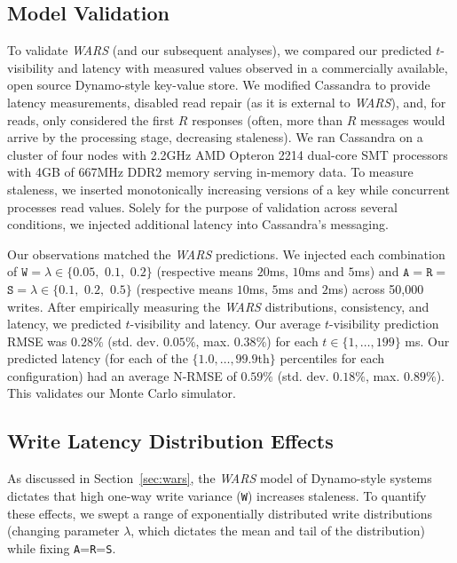 \documentclass{vldb}
\newcommand{\subsectionskip}{-0em}
\begin{document}
\vspace{\subsectionskip}\subsection{Model Validation}

To validate \textit{WARS} (and our subsequent analyses), we compared
our predicted $t$-visibility and latency with measured values observed
in a commercially available, open source Dynamo-style key-value store.
We modified Cassandra to provide latency measurements, disabled read
repair (as it is external to \textit{WARS}), and, for reads, only
considered the first $R$ responses (often, more than $R$ messages
would arrive by the processing stage, decreasing staleness).  We ran
Cassandra on a cluster of four nodes with 2.2GHz AMD Opteron 2214
dual-core SMT processors with 4GB of 667MHz DDR2 memory serving
in-memory data.  To measure staleness, we inserted monotonically
increasing versions of a key while concurrent processes read values.
Solely for the purpose of validation across several conditions, we
injected additional latency into Cassandra's messaging.

Our observations matched the \textit{WARS} predictions. We injected
each combination of $\texttt{W}=\lambda \in \{0.05,$ $0.1,$ $0.2\}$
(respective means $20$ms, $10$ms and $5$ms) and
$\texttt{A}$$=$$\texttt{R}$$=$$\texttt{S}=\lambda \in \{0.1,$ $0.2,$
$0.5\}$ (respective means $10$ms, $5$ms and $2$ms) across 50,000
writes.  After empirically measuring the \textit{WARS} distributions,
consistency, and latency, we predicted $t$-visibility and latency. Our
average $t$-visibility prediction RMSE was $0.28\%$
(std. dev. $0.05\%$, max. $0.38\%$) for each
$t\in$$\{1,$$\dots,$$199\}$ ms. Our predicted latency (for each of the
$\{1.0, \dots, 99.9$th$\}$ percentiles for each configuration) had an
average N-RMSE of $0.59\%$ (std. dev. $0.18\%$, max. $0.89\%$).  This
validates our Monte Carlo simulator.

\vspace{\subsectionskip}\subsection{Write Latency Distribution Effects}
\label{sec:synthetic}

As discussed in Section~\ref{sec:wars}, the \textit{WARS} model of
Dynamo-style systems dictates that high one-way write variance
(\texttt{W}) increases staleness.  To quantify these effects, we swept
a range of exponentially distributed write distributions (changing
parameter $\lambda$, which dictates the mean and tail of the
distribution) while fixing \texttt{A}=\texttt{R}=\texttt{S}.
\end{document}
